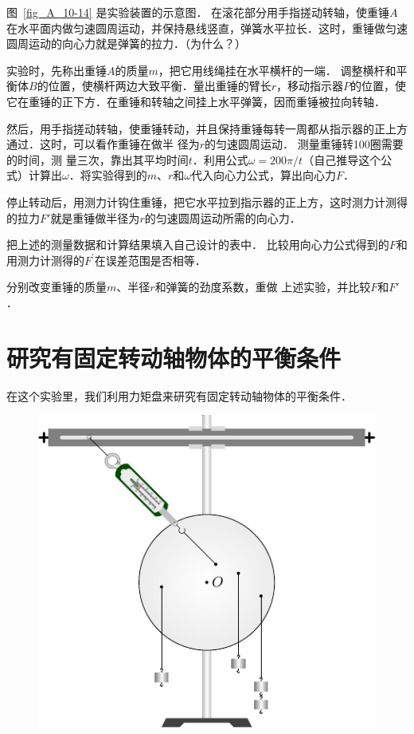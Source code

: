 图~\ref{fig_A_10-14} 是实验装置的示意图．
在滚花部分用手指搓动转轴，使重锤$A$在水平面内做匀速圆周运动，并保持悬线竖直，弹簧水平拉长．这时，重锤做匀速圆周运动的向心力就是弹簧的拉力．（为什么？）

实验时，先称出重锤$A$的质量$m$，把它用线绳挂在水平横杆的一端．
调整横杆和平衡体$B$的位置，使横杆两边大致平衡．量出重锤的臂长$r$，移动指示器$P$的位置，使它在重锤的正下方．在重锤和转轴之间挂上水平弹簧，因而重锤被拉向转轴．

然后，用手指搓动转轴，使重锤转动，并且保持重锤每转一周都从指示器的正上方通过．这时，可以看作重锤在做半
径为$r$的匀速圆周运动．
测量重锤转100圈需要的时间，测
量三次，靠出其平均时间$t$．利用公式$\omega=200\pi/t$（自己推导这个公式）计算出$\omega$．将实验得到的$m$、$r$和$\omega$代入向心力公式，算出向心力$F$．

停止转动后，用测力计钩住重锤，把它水平拉到指示器的正上方，这时测力计测得的拉力$F'$就是重锤做半径为$r$的匀速圆周运动所需的向心力．

把上述的测量数据和计算结果填入自己设计的表中．
比较用向心力公式得到的$F$和用测力计测得的$F^{\prime}$在误差范围是否相等．

分别改变重锤的质量$m$、半径$r$和弹簧的劲度系数，重做
上述实验，并比较$F$和$F'$．

\section{研究有固定转动轴物体的平衡条件}
在这个实验里，我们利用力矩盘来研究有固定转动轴物体的平衡条件．
\begin{figure}[htbp]
    \centering
    \includegraphics{fig/A/10-15.pdf}
    \caption{}\label{fig_A_10-15}
\end{figure}

